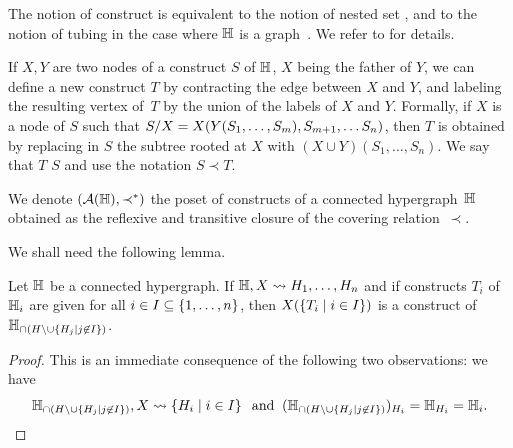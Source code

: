 \begin{remark}
    The notion of construct is equivalent to the notion of nested set \cite{P09}, and to the notion of tubing in the case where ${\mathbb H}$ is a graph~\cite{CD-CCGA}.  
    We refer to \cite[Sec.~3.1]{COI} for details.
\end{remark}


If $X,Y$ are two nodes of a construct $S$ of ${\mathbb H}$, $X$ being the father of $Y$, we can define a new construct $T$ by contracting the edge between $X$ and $Y$, and labeling the resulting vertex of~$T$ by the union of the labels of $X$ and $Y$. 
Formally, if $X$ is a node of $S$ such that $S/X=X(Y(S_1,\ldots,S_m),S_{m+1},\ldots S_n)$, then  $T$ is obtained by replacing in $S$ the  subtree rooted at $X$ with $(X\cup Y)(S_1,\ldots,S_n)$.  
We say that $T$  $S$ and use the notation $S\prec T$.


\begin{definition} 
  \label{subface-relation}
    We denote $({\cal A}({\mathbb H}),\prec^*)$ the poset of constructs of a connected hypergraph~${\mathbb H}$ obtained as the reflexive and transitive closure of the  covering relation~$\prec$.    
\end{definition}
    
We shall need the following lemma.
\begin{lemma} 
  \label{partial-construct}
Let ${\mathbb H}$ be a connected hypergraph. 
If ${\mathbb H},X\leadsto H_1,\ldots,H_n$ and if constructs $T_i$ of~${\mathbb H}_i$ are given for all $i\in I\subseteq \left\{1,\ldots,n\right\}$, then $X(\left\{T_i \mid i\in I\right\})$ is a construct of ${\mathbb H}_{\cap (H\setminus\cup\left\{H_j \mid j\not\in I\right\})}$.
\end{lemma}
\begin{proof} This is an immediate consequence of the following two observations: we have
$${\mathbb H}_{\cap (H\setminus\cup\left\{H_j \mid j\not\in I\right\})},X\leadsto \left\{H_i \mid i\in I\right\}\;\; \mbox{and}\;\; ({\mathbb H}_{\cap (H\setminus\cup\left\{H_j \mid j\not\in I\right\})})_{H_i}={\mathbb H}_{H_i}={\mathbb H}_i.$$
\end{proof}

